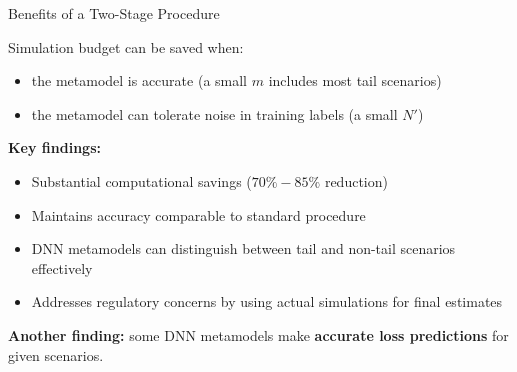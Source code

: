 \documentclass[9pt,handout]{beamer}
\begin{document}
\begin{frame}{Benefits of a Two-Stage Procedure}


Simulation budget can be saved when:
\begin{itemize}
    \item the metamodel is accurate (a small $m$ includes most tail scenarios)
    \item the metamodel can tolerate noise in training labels (a small $N'$)
\end{itemize}

\vspace{10pt}

\textbf{Key findings:}
\begin{itemize}
    \item Substantial computational savings ($70\% - 85\%$ reduction)
    \item Maintains accuracy comparable to standard procedure
    \item DNN metamodels can distinguish between tail and non-tail scenarios effectively
    \item Addresses regulatory concerns by using actual simulations for final estimates
\end{itemize}

\vspace{10pt}
\textbf{Another finding:} 
some DNN metamodels make \textbf{accurate loss predictions} for given scenarios.

\end{frame}
\end{document}
